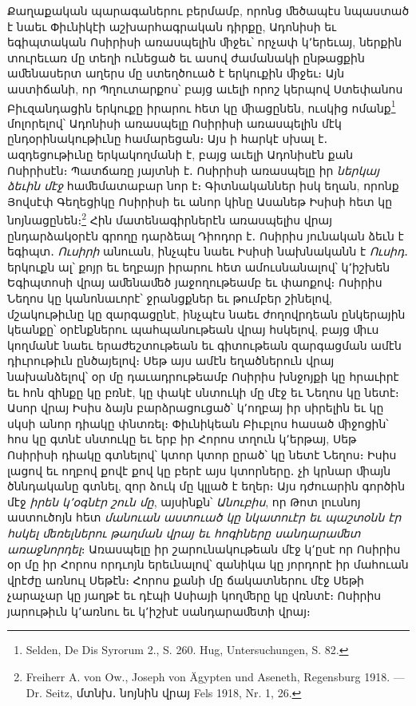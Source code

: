 \documentclass{article}
\begin{document}
{Քաղաքական պարագաներու բերմամբ, որոնց ﬔծապէս նպաստած է նաեւ Փիւնիկէի աշխարհագրական դիրքը, Ադոնիսի եւ եգիպտական Ոսիրիսի առասպելին ﬕջեւ՝ որչափ կ՚երեւայ, ներքին տուրեւառ մը տեղի ունեցած եւ ասով ժամանակի ընթացքին աﬔնասերտ աղերս մը ստեղծուած է երկուքին ﬕջեւ։ Այն աստիճանի, որ Պղուտարքոս՝ բայց աւելի որոշ կերպով Ստեփանոս Բիւզանդացին երկուքը իրարու հետ կը ﬕացընեն, ուսկից ոմանք\footnote{Selden, De Dis Syrorum 2., S. 260. Hug, Untersuchungen, S. 82.} մոլորելով՝ Ադոնիսի առասպելը Ոսիրիսի առասպելին մէկ ընդօրինակութիւնը համարեցան։ Այս ի հարկէ սխալ է․ ազդեցութիւնը երկակողմանի է, բայց աւելի Ադոնիսէն քան Ոսիրիսէն։ Պատճառը յայտնի է․ Ոսիրիսի առասպելը իր \emph{ներկայ ձեւին մէջ} հաﬔմատաբար նոր է։ Գիտնականներ իսկ եղան, որոնք Յովսէփ Գեղեցիկը Ոսիրիսի եւ անոր կինը Ասանեթ Իսիսի հետ կը նոյնացընեն։\footnote{Freiherr A. von Ow., Joseph von Ägypten und Aseneth, Regensburg 1918. — Dr. Seitz, մտնխ․ նոյնին վրայ Fels 1918, Nr. 1, 26.} Հին մատենագիրներէն առասպելիս վրայ ընդարձակօրէն գրողը դարձեալ Դիոդոր է․ Ոսիրիս յունական ձեւն է եգիպտ․ \emph{Ուսիրի} անուան, ինչպէս նաեւ Իսիսի նախնականն է \emph{Ուսիդ}․ երկուքն ալ՝ քոյր եւ եղբայր իրարու հետ ամուսնանալով՝ կ՚իշխեն Եգիպտոսի վրայ աﬔնաﬔծ յաջողութեամբ եւ փաոքով։ Ոսիրիս Նեղոս կը կանոնաւորէ՝ ջրանցքներ եւ թումբեր շինելով, մշակութիւնը կը զարգացընէ, ինչպէս նաեւ ժողովրդեան ընկերային կեանքը՝ օրէնքներու պահպանութեան վրայ հսկելով, բայց ﬕւս կողմանէ նաեւ երաժեշտութեան եւ գիտութեան զարգացման ամէն դիւրութիւն ընծայելով։ Սեթ այս ամէն եղածներուն վրայ նախանձելով՝ օր մը դաւադրութեամբ Ոսիրիս խնջոյքի կը հրաւիրէ եւ հոն զինքը կը բռնէ, կը փակէ սնտուկի մը մէջ եւ Նեղոս կը նետէ։ Ասոր վրայ Իսիս ձայն բարձրացուցած՝ կ՚ողբայ իր սիրելին եւ կը սկսի անոր դիակը փնտռել։ Փիւնիկեան Բիւբլոս հասած ﬕջոցին՝ հոս կը գտնէ սնտուկը եւ երբ իր Հորոս տղուն կ՚երթայ, Սեթ Ոսիրիսի դիակը գտնելով՝ կտոր կտոր ըրած՝ կը նետէ Նեղոս։ Իսիս լացով եւ ողբով քովէ քով կը բերէ այս կտորները․ չի կրնար ﬕայն ծննդականը գտնել, զոր ձուկ մը կլլած է եղեր։ Այս դժուարին գործին մէջ \emph{իրեն կ՚օգնէր շուն մը}, այսինքն՝ \emph{Անուբիս}, որ Թոտ լուսնոյ աստուծոյն հետ \emph{մանուան աստուած կը նկատուէր եւ պաշտօնն էր հսկել ﬔռելներու թաղման վրայ եւ հոգիները սանդարաﬔտ առաջնորդել}։ Առասպելը իր շարունակութեան մէջ կ՚ըսէ որ Ոսիրիս օր մը իր Հորոս որդւոյն երեւնալով՝ զանիկա կը յորդորէ իր մահուան վրէժը առնուլ Սեթէն։ Հորոս քանի մը ճակատներու մէջ Սեթի չարաչար կը յաղթէ եւ դէպի Ասիայի կողﬔրը կը վռնտէ։ Ոսիրիս յարութիւն կ՚առնու եւ կ՚իշխէ սանդարաﬔտի վրայ։

}
\end{document}
